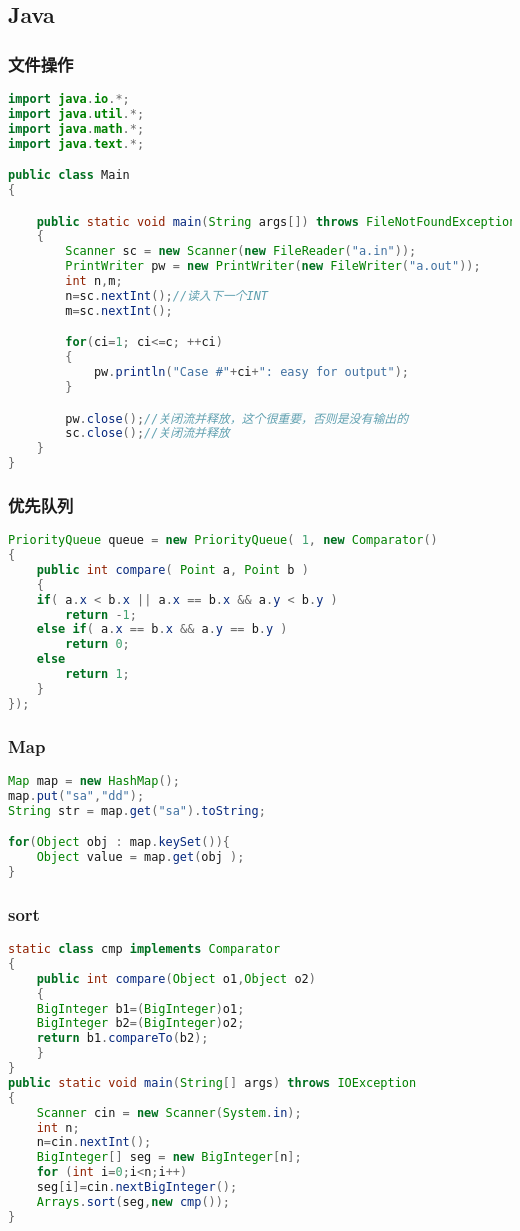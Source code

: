 \subsection{Java}
    \subsubsection{文件操作}
	\begin{lstlisting}[language=java]
import java.io.*;
import java.util.*;
import java.math.*;
import java.text.*;

public class Main
{

    public static void main(String args[]) throws FileNotFoundException, IOException
    {
        Scanner sc = new Scanner(new FileReader("a.in"));
        PrintWriter pw = new PrintWriter(new FileWriter("a.out"));
        int n,m;
        n=sc.nextInt();//读入下一个INT
        m=sc.nextInt();

        for(ci=1; ci<=c; ++ci)
        {
            pw.println("Case #"+ci+": easy for output");
        }

        pw.close();//关闭流并释放，这个很重要，否则是没有输出的
        sc.close();//关闭流并释放
    }
}
	\end{lstlisting}
	
    \subsubsection{优先队列}
	\begin{lstlisting}[language=java]
PriorityQueue queue = new PriorityQueue( 1, new Comparator()
{
    public int compare( Point a, Point b )
    {
	if( a.x < b.x || a.x == b.x && a.y < b.y )
	    return -1;
	else if( a.x == b.x && a.y == b.y )
	    return 0;
	else
	    return 1;
    }
});
	\end{lstlisting}
	
    \subsubsection{Map}
	\begin{lstlisting}[language=java]
Map map = new HashMap();
map.put("sa","dd");
String str = map.get("sa").toString;

for(Object obj : map.keySet()){
    Object value = map.get(obj );
}
	\end{lstlisting}
	
    \subsubsection{sort}
	\begin{lstlisting}[language=java]
static class cmp implements Comparator
{
    public int compare(Object o1,Object o2)
    {
	BigInteger b1=(BigInteger)o1;
	BigInteger b2=(BigInteger)o2;
	return b1.compareTo(b2);
    }
}
public static void main(String[] args) throws IOException
{
    Scanner cin = new Scanner(System.in);
    int n;
    n=cin.nextInt();
    BigInteger[] seg = new BigInteger[n];
    for (int i=0;i<n;i++)
	seg[i]=cin.nextBigInteger();
    Arrays.sort(seg,new cmp());
}
	\end{lstlisting}
